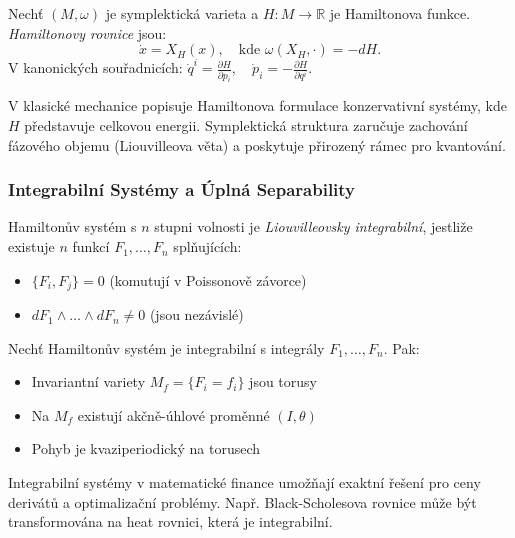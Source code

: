 \begin{definition}
Nechť $(M, \omega)$ je symplektická varieta a $H: M \to \mathbb{R}$ je Hamiltonova funkce. \emph{Hamiltonovy rovnice} jsou:
\[
\dot{x} = X_H(x), \quad \text{kde } \omega(X_H, \cdot) = -dH.
\]
V kanonických souřadnicích: $\dot{q}^i = \frac{\partial H}{\partial p_i}, \quad \dot{p}_i = -\frac{\partial H}{\partial q^i}$.
\end{definition}

\begin{application}
V klasické mechanice popisuje Hamiltonova formulace konzervativní systémy, kde $H$ představuje celkovou energii. Symplektická struktura zaručuje zachování fázového objemu (Liouvilleova věta) a poskytuje přirozený rámec pro kvantování.
\end{application}

\subsubsection{Integrabilní Systémy a Úplná Separability}

\begin{definition}
Hamiltonův systém s $n$ stupni volnosti je \emph{Liouvilleovsky integrabilní}, jestliže existuje $n$ funkcí $F_1, \dots, F_n$ splňujících:
\begin{itemize}
\item $\{F_i, F_j\} = 0$ (komutují v Poissonově závorce)
\item $dF_1 \wedge \dots \wedge dF_n \neq 0$ (jsou nezávislé)
\end{itemize}
\end{definition}

\begin{theorem}
Nechť Hamiltonův systém je integrabilní s integrály $F_1, \dots, F_n$. Pak:
\begin{itemize}
\item Invariantní variety $M_f = \{F_i = f_i\}$ jsou torusy
\item Na $M_f$ existují akčně-úhlové proměnné $(I, \theta)$
\item Pohyb je kvaziperiodický na torusech
\end{itemize}
\end{theorem}

\begin{application}
Integrabilní systémy v matematické finance umožňají exaktní řešení pro ceny derivátů a optimalizační problémy. Např. Black-Scholesova rovnice může být transformována na heat rovnici, která je integrabilní.
\end{application}

